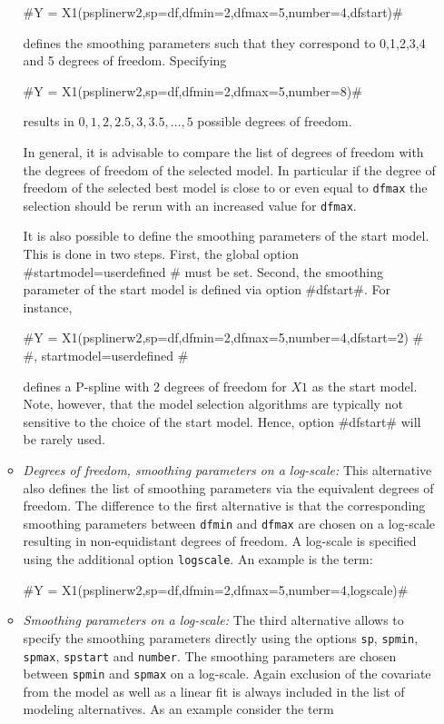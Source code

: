 \begin{itemize}
\begin{itemize}
#Y = X1(psplinerw2,sp=df,dfmin=2,dfmax=5,number=4,dfstart)#

defines the smoothing parameters such that they correspond to 0,1,2,3,4 and 5 degrees of freedom. Specifying

#Y = X1(psplinerw2,sp=df,dfmin=2,dfmax=5,number=8)#

results in $0,1,2,2.5,3,3.5,\dots,5$ possible degrees of freedom.

In general, it is advisable to compare the list of degrees of freedom with the degrees of freedom of the selected model. In particular if the
degree of freedom of the selected best model is close to or even equal to {\tt dfmax} the selection should be rerun with an increased
value for {\tt dfmax}.

It is also possible to define the smoothing parameters of the start model.
This is done in two steps. First, the global option #startmodel=userdefined # must be set. Second, the smoothing parameter
of the  start model is defined via option #dfstart#. For instance,

#Y = X1(psplinerw2,sp=df,dfmin=2,dfmax=5,number=4,dfstart=2) # \\
#, startmodel=userdefined #

defines a P-spline with 2 degrees of freedom for $X1$ as the start model. Note, however, that the model selection algorithms are
typically not sensitive to the choice of the start model. Hence, option #dfstart# will be rarely used.

\item {\em Degrees of freedom, smoothing parameters on a log-scale:}
This alternative  also defines the list of smoothing parameters via the equivalent degrees of freedom. The difference to the
first alternative is that the corresponding smoothing parameters between {\tt dfmin} and {\tt dfmax}  are chosen on a log-scale resulting
in non-equidistant degrees of freedom. A log-scale is specified using the additional option {\tt logscale}. An example is the term:

#Y = X1(psplinerw2,sp=df,dfmin=2,dfmax=5,number=4,logscale)#

\item {\em Smoothing parameters on a log-scale:}
The third alternative allows to specify the smoothing parameters directly using the options {\tt sp}, {\tt spmin}, {\tt spmax}, {\tt spstart}
and {\tt number}. The smoothing parameters are chosen between {\tt spmin} and {\tt spmax} on a log-scale. Again exclusion of the covariate from the
model as well as a linear fit is always included in the list of modeling alternatives. As an example consider the term


\end{itemize}
\end{itemize}
